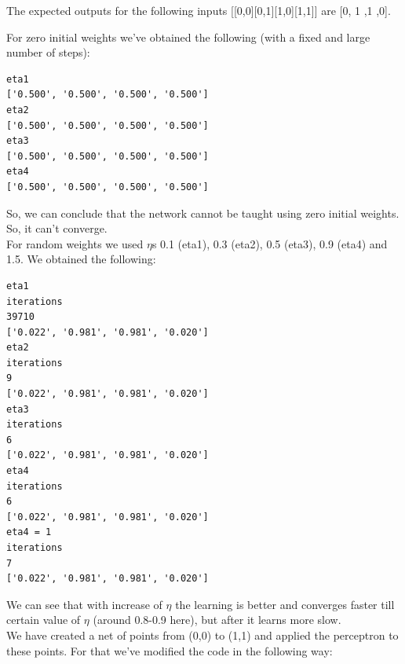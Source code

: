 \documentclass[a4paper, 12pt]{article}
\begin{document}
The expected outputs for the following inputs [[0,0][0,1][1,0][1,1]] are [0, 1 ,1 ,0].

For zero initial weights we've obtained the following (with a fixed and large number of steps):

\lstset{language=Python}
\begin{lstlisting}[frame=single]
eta1
['0.500', '0.500', '0.500', '0.500']
eta2
['0.500', '0.500', '0.500', '0.500']
eta3
['0.500', '0.500', '0.500', '0.500']
eta4
['0.500', '0.500', '0.500', '0.500']
\end{lstlisting}

So, we can conclude that the network cannot be taught using zero initial weights. So, it can't converge.\\

For random weights we used $\eta$s 0.1 (eta1), 0.3 (eta2), 0.5 (eta3), 0.9 (eta4) and 1.5. We obtained the following:
\lstset{language=Python}
\begin{lstlisting}[frame=single]
eta1
iterations
39710
['0.022', '0.981', '0.981', '0.020']
eta2
iterations
9
['0.022', '0.981', '0.981', '0.020']
eta3
iterations
6
['0.022', '0.981', '0.981', '0.020']
eta4
iterations
6
['0.022', '0.981', '0.981', '0.020']
eta4 = 1
iterations
7
['0.022', '0.981', '0.981', '0.020']
\end{lstlisting}

We can see that with increase of $\eta$ the learning is better and converges faster till certain value of $\eta$ (around 0.8-0.9 here), but after it learns more slow.\\

We have created a net of points from (0,0) to (1,1) and applied the perceptron to these points. For that we've modified the code in the following way:
\end{document}
